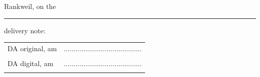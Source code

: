 	\par Rankweil, on the \PrintDate \\		
	
	\noindent\rule{\textwidth}{0.4pt}
	delivery note:
	\linebreak
	
	\begin{tabular}{p{7cm}C{6cm}}
		\hspace{1cm} DA original, am \PrintDate & ........................................ \\ 
		& \supervisor \\ [2.5em]
		
		\hspace{1cm} DA digital, am \PrintDate & ........................................ \\ 
		& \supervisor \\
	\end{tabular}
	
	
	\pagebreak

